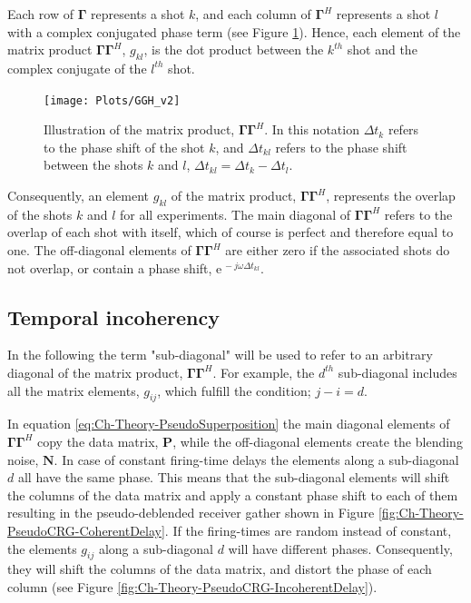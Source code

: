 Each row of $\mathbf{\Gamma}$ represents a shot $k$, and each column of $\mathbf{\Gamma}^H$ represents a shot $l$ with a complex conjugated phase term (see Figure \ref{fig:Ch-Theory-GGH}). Hence, each element of the matrix product $\mathbf{\Gamma \Gamma}^H$, $g_{kl}$, is the dot product between the $k^{th}$ shot and the complex conjugate of the $l^{th}$ shot.

\begin{figure}
	\centering
	\texttt{[image: Plots/GGH\_v2]}
	\caption{Illustration of the matrix product, $\mathbf{\Gamma \Gamma}^H$. In this notation $\Delta t_k$ refers to the phase shift of the shot $k$, and $\Delta t_{kl}$ refers to the phase shift between the shots $k$ and $l$, $\Delta t_{kl} = \Delta t_k - \Delta t_l$.}
	\label{fig:Ch-Theory-GGH}
\end{figure}

Consequently, an element $g_{kl}$ of the matrix product, $\mathbf{\Gamma \Gamma}^H$, represents the overlap of the shots $k$ and $l$ for all experiments. The main diagonal of $\mathbf{\Gamma \Gamma}^H$ refers to the overlap of each shot with itself, which of course is perfect and therefore equal to one. The off-diagonal elements of $\mathbf{\Gamma \Gamma}^H$ are either zero if the associated shots do not overlap, or contain a phase shift, $\mathrm{e}^{\, -j \omega \Delta t_{kl}}$.

\subsection*{Temporal incoherency}

In the following the term "sub-diagonal" will be used to refer to an arbitrary diagonal of the matrix product, $\mathbf{\Gamma \Gamma}^H$. For example, the $d^{th}$ sub-diagonal includes all the matrix elements, $g_{ij}$, which fulfill the condition; $j -i = d$.

In equation \ref{eq:Ch-Theory-PseudoSuperposition} the main diagonal elements of $\mathbf{\Gamma \Gamma}^H$ copy the data matrix, $\mathbf{P}$, while the off-diagonal elements create the blending noise, $\mathbf{N}$. In case of constant firing-time delays the elements along a sub-diagonal $d$ all have the same phase. This means that the sub-diagonal elements will shift the columns of the data matrix and apply a constant phase shift to each of them resulting in the pseudo-deblended receiver gather shown in Figure \ref{fig:Ch-Theory-PseudoCRG-CoherentDelay}. If the firing-times are random instead of constant, the elements $g_{ij}$ along a sub-diagonal $d$ will have different phases. Consequently, they will shift the columns of the data matrix, and distort the phase of each column (see Figure \ref{fig:Ch-Theory-PseudoCRG-IncoherentDelay}). 


